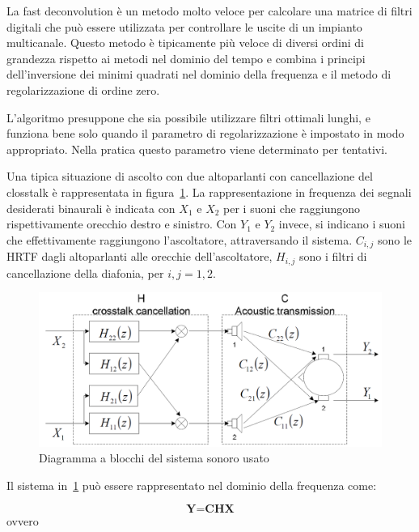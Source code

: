 \documentclass[12pt,a4paper,titlepage]{article}
\begin{document}
La fast deconvolution è un metodo molto veloce per calcolare una matrice di filtri digitali che può essere utilizzata per controllare le uscite di un impianto multicanale. Questo metodo è tipicamente più veloce di diversi ordini di grandezza rispetto ai metodi nel dominio del tempo e combina i principi dell'inversione dei minimi quadrati nel dominio della frequenza e il metodo di regolarizzazione di ordine zero.%

L'algoritmo presuppone che sia possibile utilizzare filtri ottimali lunghi, e funziona bene solo quando il parametro di regolarizzazione è impostato in modo appropriato. Nella pratica questo parametro viene determinato per tentativi.%

Una tipica situazione di ascolto con due altoparlanti con cancellazione del closstalk è rappresentata in figura~\ref{fig:head}. La rappresentazione in frequenza dei segnali desiderati binaurali è indicata con $X_1$ e $X_2$ per i suoni che raggiungono rispettivamente orecchio destro e sinistro.
Con $Y_1$ e $Y_2$ invece, si indicano i suoni che effettivamente raggiungono l'ascoltatore, attraversando il sistema. $C_{i, j}$ sono le HRTF dagli altoparlanti alle orecchie dell'ascoltatore, $H_{i,j}$ sono i filtri di cancellazione della diafonia, per $i , j =1,2$.

\begin{figure}[h]
	\centering	
	\includegraphics[width=1\textwidth]{Immagini/head}
	\caption{Diagramma a blocchi del sistema sonoro usato}
	\label{fig:head}
\end{figure}
Il sistema in~\ref{fig:head} può essere rappresentato nel dominio della frequenza come:

\begin{equation}
\textbf{Y} = \textbf{CHX}
\end{equation}
ovvero
\end{document}
